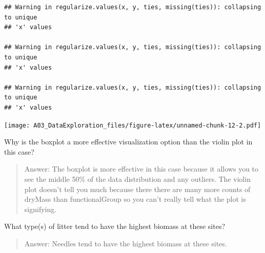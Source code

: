 \documentclass[]{article}
\begin{document}
\begin{verbatim}
## Warning in regularize.values(x, y, ties, missing(ties)): collapsing to unique
## 'x' values

## Warning in regularize.values(x, y, ties, missing(ties)): collapsing to unique
## 'x' values

## Warning in regularize.values(x, y, ties, missing(ties)): collapsing to unique
## 'x' values
\end{verbatim}

\texttt{[image: A03\_DataExploration\_files/figure-latex/unnamed-chunk-12-2.pdf]}

Why is the boxplot a more effective visualization option than the violin
plot in this case?

\begin{quote}
Answer: The boxplot is more effective in this case because it allows you
to see the middle 50\% of the data distribution and any outliers. The
violin plot doesn't tell you much because there there are many more
counts of dryMass than functionalGroup so you can't really tell what the
plot is signifying.
\end{quote}

What type(s) of litter tend to have the highest biomass at these sites?

\begin{quote}
Answer: Needles tend to have the highest biomass at these sites.
\end{quote}
\end{document}
